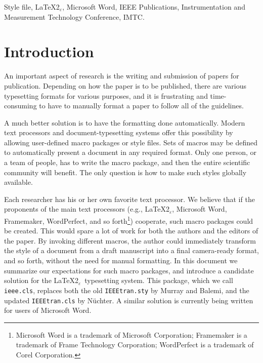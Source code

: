\documentclass[%
	final,
	notitlepage,
	narroweqnarray,
	inline,
	twoside,
	]{ieee}
\newcommand{\latexiie}{\LaTeX2{\Large$_\varepsilon$}}
\begin{document}
\begin{keywords}
Style file, \latexiie, Microsoft Word, IEEE Publications, Instrumentation
and Measurement Technology Conference, IMTC.
\end{keywords}

\section{Introduction}

\PARstart An important aspect of research is the writing and
submission of papers for publication. Depending on how the paper is to
be published, there are various typesetting formats for various
purposes, and it is frustrating and time-consuming to have to manually
format a paper to follow all of the guidelines.

A much better solution is to have the formatting done automatically.
Modern text processors and document-typesetting systems offer this
possibility by allowing user-defined macro packages or style files.
Sets of macros may be defined to automatically present a document in
any required format. Only one person, or a team of people, has to
write the macro package, and then the entire scientific community will
benefit. The only question is how to make such styles globally
available.

Each researcher has his or her own favorite text processor. We believe
that if the proponents of the main text processors (e.g., \latexiie,
Microsoft Word, Framemaker, WordPerfect, and so
forth\footnote{Microsoft Word is a trademark of Microsoft Corporation;
Frame\-maker is a trademark of Frame Technology Corporation;
WordPerfect is a trademark of Corel Corporation.}) cooperate, such
macro packages could be created. This would spare a lot of work for
both the authors and the editors of the paper.  By invoking different
macros, the author could immediately transform the style of a document
from a draft manuscript into a final camera-ready format, and so
forth, without the need for manual formatting.  In this document we
summarize our expectations for such macro packages, and introduce a
candidate solution for the \latexiie\ typesetting system. This
package, which we call \texttt{ieee.cls}, replaces both the old
\texttt{IEEEtran.sty} by Murray and Balemi, and the updated
\texttt{IEEEtran.cls} by N\"{u}chter. A similar solution is currently
being written for users of Microsoft Word.
\end{document}
